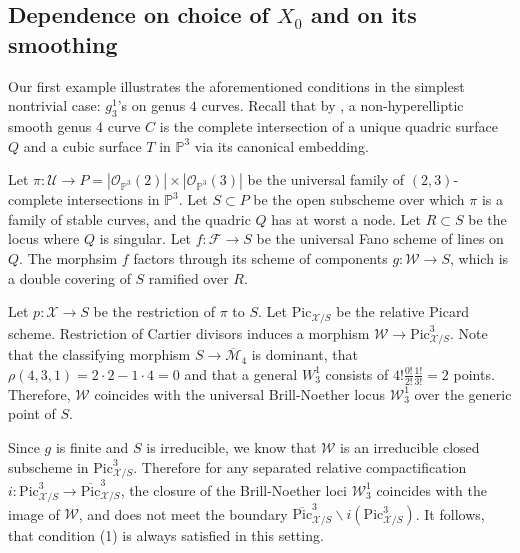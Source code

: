 \documentclass[11pt]{amsart}
\begin{document}
\subsection{Dependence on choice of $X_0$ and on its smoothing} %

Our first example illustrates the aforementioned conditions in the simplest nontrivial case: $g_3^1$'s on genus $4$ curves. Recall that by \cite[IV. Example 5.2.2]{MR0463157}, a non-hyperelliptic smooth genus $4$ curve $C$ is the complete intersection of a unique quadric surface $Q$  and a cubic surface $T$ in $\mathbb{P}^3$ via its canonical embedding. 

Let $\pi\colon\mathcal{U}\to P=|\mathcal{O}_{\mathbb{P}^3}(2)|\times |\mathcal{O}_{\mathbb{P}^3}(3)|$ be the universal family of $(2,3)$-complete intersections in $\mathbb{P}^3$. Let $S\subset P$ be the open subscheme over which $\pi$ is a family of stable curves, and the quadric $Q$ has at worst a node. Let $R\subset S$ be the locus where $Q$ is singular. Let $f\colon\mathcal{F}\to S$ be the universal Fano scheme of lines on $Q$. The morphsim $f$ factors through its scheme of components $g\colon \mathcal{W}\to S$, which is a double covering of $S$ ramified over $R$.

Let $p\colon \mathcal{X}\to S$ be the restriction of $\pi$ to $S$. Let $\mathrm{Pic}_{\mathcal{X}/S}$ be the relative Picard scheme. Restriction of Cartier divisors induces a morphism $\mathcal{W}\to \mathrm{Pic}^3_{\mathcal{X}/S}$. Note that the classifying morphism $S\to\overline{\mathcal{M}}_4$ is dominant, that $\rho(4,3,1)=2\cdot2-1\cdot4=0$ and that a general $W_3^1$ consists of $4!\frac{0!}{2!}\frac{1!}{3!}=2$ points. Therefore, $\mathcal{W}$ coincides with the universal Brill-Noether locus $\mathcal{W}_3^1$ over the generic point of $S$.

Since $g$ is finite and $S$ is irreducible, we know that $\mathcal{W}$ is an irreducible closed subscheme in $\mathrm{Pic}^3_{\mathcal{X}/S}$. 
Therefore for any separated relative compactification $i\colon \mathrm{Pic}^3_{\mathcal{X}/S}\to \overline{\mathrm{Pic}}^3_{\mathcal{X}/S}$, the closure of the Brill-Noether loci $\mathcal{W}_3^1$ coincides with the image of $\mathcal{W}$, and does not meet the boundary $\overline{\mathrm{Pic}}^3_{\mathcal{X}/S}\backslash i(\mathrm{Pic}^3_{\mathcal{X}/S})$. %
It follows, that condition (1) is always satisfied in this setting.
\end{document}
